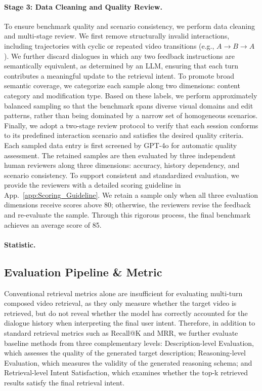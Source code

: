 \paragraph{Stage 3: Data Cleaning and Quality Review.}
To ensure benchmark quality and scenario consistency, we perform data cleaning and multi-stage review. We first remove structurally invalid interactions, including trajectories with cyclic or repeated video transitions (e.g., \(A \rightarrow B \rightarrow A\)). We further discard dialogues in which any two feedback instructions are semantically equivalent, as determined by an LLM, ensuring that each turn contributes a meaningful update to the retrieval intent. To promote broad semantic coverage, we categorize each sample along two dimensions: content category and modification type. Based on these labels, we perform approximately balanced sampling so that the benchmark spans diverse visual domains and edit patterns, rather than being dominated by a narrow set of homogeneous scenarios. Finally, we adopt a two-stage review protocol to verify that each session conforms to its predefined interaction scenario and satisfies the desired quality criteria. Each sampled data entry is first screened by GPT-4o for automatic quality assessment. The retained samples are then evaluated by three independent human reviewers along three dimensions: accuracy, history dependency, and scenario consistency. To support consistent and standardized evaluation, we provide the reviewers with a detailed scoring guideline in App.~\ref{app:Scoring_Guideline}. We retain a sample only when all three evaluation dimensions receive scores above 80; otherwise, the reviewers revise the feedback and re-evaluate the sample. Through this rigorous process, the final benchmark achieves an average score of 85.


\paragraph{Statistic.}



\subsection{Evaluation Pipeline & Metric} 
Conventional retrieval metrics alone are insufficient for evaluating multi-turn composed video retrieval, as they only measure whether the target video is retrieved, but do not reveal whether the model has correctly accounted for the dialogue history when interpreting the final user intent. Therefore, in addition to standard retrieval metrics such as Recall@K and MRR, we further evaluate baseline methods from three complementary levels: Description-level Evaluation, which assesses the quality of the generated target description; Reasoning-level Evaluation, which measures the validity of the generated reasoning schema; and Retrieval-level Intent Satisfaction, which examines whether the top-k retrieved results satisfy the final retrieval intent.


